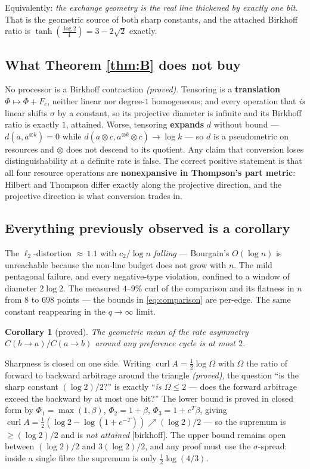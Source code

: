 \documentclass[11pt]{article}
\theoremstyle{plain}
\newtheorem{corollary}[theorem]{Corollary}
\theoremstyle{remark}
\newcommand{\ra}{\rightarrow}
\newcommand{\source}[1]{{\normalfont\small\textsf{[#1]}}}
\begin{document}
Equivalently: \emph{the exchange geometry is the real line thickened by exactly
one bit.}  That is the geometric source of both sharp constants, and the
attached Birkhoff ratio is $\tanh(\tfrac{\log 2}{4}) = 3 - 2\sqrt2$ exactly.

\subsection{What Theorem \ref{thm:B} does not buy}

No processor is a Birkhoff contraction \emph{(proved)}.  Tensoring is a
\textbf{translation} $\Phi \mapsto \Phi + F_c$, neither linear nor degree-$1$
homogeneous; and every operation that \emph{is} linear shifts $\sigma$ by a
constant, so its projective diameter is infinite and its Birkhoff ratio is
exactly $1$, attained.  Worse, tensoring \textbf{expands} $d$ without bound ---
$d(a, a^{\otimes k}) = 0$ while $d(a\otimes c, a^{\otimes k}\otimes c) \to \log k$
--- so $d$ is a pseudometric on resources and $\otimes$ does not descend to its
quotient.  Any claim that conversion loses distinguishability at a definite rate
is false.  The correct positive statement is that all four resource operations
are \textbf{nonexpansive in Thompson's part metric}: Hilbert and Thompson differ
exactly along the projective direction, and the projective direction is what
conversion trades in.

\subsection{Everything previously observed is a corollary}

The $\ell_2$-distortion ${\approx}\,1.1$ with $c_2/\log n$ \emph{falling} ---
Bourgain's $O(\log n)$ is unreachable because the non-line budget does not grow
with $n$.  The mild pentagonal failure, and every negative-type violation,
confined to a window of diameter $2\log 2$.  The measured $4$--$9\%$ curl of the
comparison and its flatness in $n$ from $8$ to $698$ points --- the bounds in
\eqref{eq:comparison} are per-edge.  The same constant reappearing in the
$q\to\infty$ limit.

\begin{corollary}[proved]\label{cor:C}
The geometric mean of the rate asymmetry $C(b\ra a)/C(a\ra b)$ around
\emph{any} preference cycle is at most $2$.
\end{corollary}

Sharpness is closed on one side.  Writing $\operatorname{curl} A = \frac12\log\Omega$
with $\Omega$ the ratio of forward to backward arbitrage around the triangle
\emph{(proved)}, the question ``is the sharp constant $(\log 2)/2$?'' is exactly
``\emph{is $\Omega \le 2$} --- does the forward arbitrage exceed the backward by
at most one bit?''  The lower bound is proved in closed form by
$\Phi_1 = \max(1,\beta)$, $\Phi_2 = 1+\beta$, $\Phi_3 = 1+e^T\beta$, giving
$\operatorname{curl} A = \frac12(\log 2 - \log(1+e^{-T})) \nearrow (\log 2)/2$ ---
so the supremum is $\ge (\log 2)/2$ and is \emph{not attained}
\source{birkhoff}.  The upper bound remains open between $(\log 2)/2$ and
$3(\log 2)/2$, and any proof must use the $\sigma$-spread: inside a single fibre
the supremum is only $\frac12\log(4/3)$.
\end{document}
